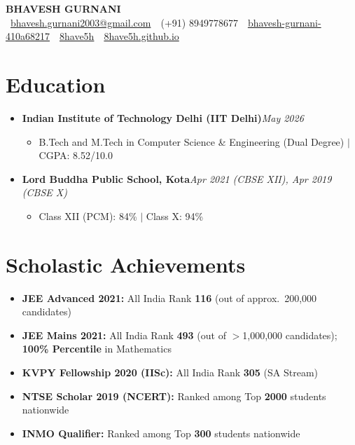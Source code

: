 \documentclass[10pt,letterpaper]{article}
\newcommand{\lnk}[2]{\href{#1}{\color{linkblue}#2}}
\newcommand{\dates}[1]{\hfill{\color{dateblue}\itshape #1}}
\begin{document}
\begin{center}
  {\fontsize{26}{30}\selectfont\bfseries\color{headblue}BHAVESH GURNANI}\\[4pt]
  \small
  \faEnvelope\ \lnk{mailto:bhavesh.gurnani2003@gmail.com}{bhavesh.gurnani2003@gmail.com}\quad\
  \faPhone*\ (+91) 8949778677\quad\
  \faLinkedin\ \lnk{https://linkedin.com/in/bhavesh-gurnani-410a68217}{bhavesh-gurnani-410a68217}\quad\
  \faGithub\ \lnk{https://github.com/8have5h}{8have5h}\quad\
  \faGlobe\ \lnk{https://8have5h.github.io/}{8have5h.github.io}
\end{center}

\section{Education}
\begin{itemize}
  \item \textbf{Indian Institute of Technology Delhi (IIT Delhi)}\dates{May 2026}
  \begin{itemize}
    \item B.Tech and M.Tech in Computer Science \& Engineering (Dual Degree) $|$ CGPA: 8.52/10.0
  \end{itemize}
  \item \textbf{Lord Buddha Public School, Kota}\dates{Apr 2021 (CBSE XII), Apr 2019 (CBSE X)}
  \begin{itemize}
    \item Class XII (PCM): 84\% $|$ Class X: 94\%
  \end{itemize}
\end{itemize}

\section{Scholastic Achievements}
\begin{itemize}
  \item \textbf{JEE Advanced 2021:} All India Rank \textbf{116} (out of approx.\ 200,000 candidates)
  \item \textbf{JEE Mains 2021:} All India Rank \textbf{493} (out of $>$1,000,000 candidates); \textbf{100\% Percentile} in Mathematics
  \item \textbf{KVPY Fellowship 2020 (IISc):} All India Rank \textbf{305} (SA Stream)
  \item \textbf{NTSE Scholar 2019 (NCERT):} Ranked among Top \textbf{2000} students nationwide
  \item \textbf{INMO Qualifier:} Ranked among Top \textbf{300} students nationwide
\end{itemize}
\end{document}
